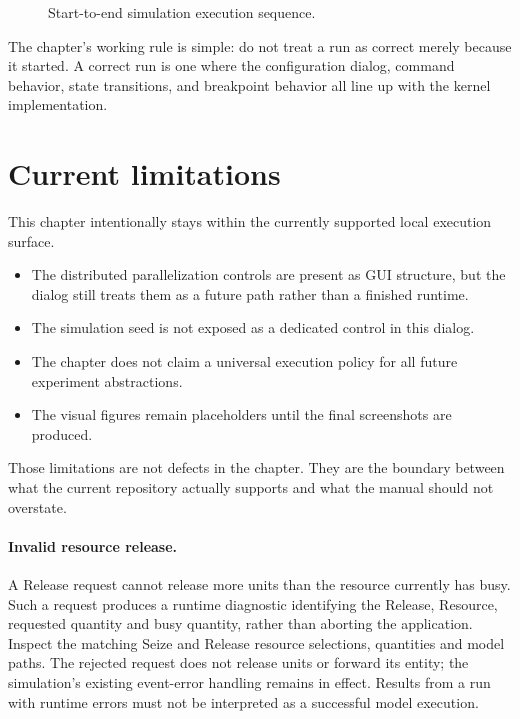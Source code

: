 \begin{figure}[htbp]
\centering
\caption{Start-to-end simulation execution sequence.}
\label{fig:running-simulations-sequence}
\end{figure}

The chapter's working rule is simple: do not treat a run as correct merely
because it started. A correct run is one where the configuration dialog,
command behavior, state transitions, and breakpoint behavior all line up with
the kernel implementation.

\section{Current limitations}
\label{sec:running-simulations-limitations}

This chapter intentionally stays within the currently supported local execution
surface.
\begin{itemize}
\item The distributed parallelization controls are present as GUI structure, but
the dialog still treats them as a future path rather than a finished runtime.
\item The simulation seed is not exposed as a dedicated control in this dialog.
\item The chapter does not claim a universal execution policy for all future
experiment abstractions.
\item The visual figures remain placeholders until the final screenshots are
produced.
\end{itemize}

Those limitations are not defects in the chapter. They are the boundary between
what the current repository actually supports and what the manual should not
overstate.

\paragraph{Invalid resource release.}
A Release request cannot release more units than the resource currently has busy.
Such a request produces a runtime diagnostic identifying the Release, Resource,
requested quantity and busy quantity, rather than aborting the application.
Inspect the matching Seize and Release resource selections, quantities and model
paths. The rejected request does not release units or forward its entity; the
simulation's existing event-error handling remains in effect. Results from a run
with runtime errors must not be interpreted as a successful model execution.

